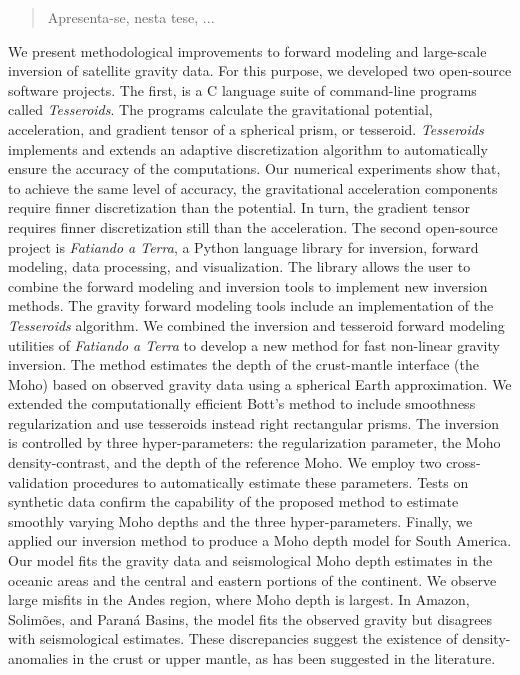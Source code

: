 \begin{abstract}

Apresenta-se, nesta tese, ...

\end{abstract}

\begin{foreignabstract}

We present methodological improvements to forward modeling and large-scale
inversion of satellite gravity data.
For this purpose, we developed two open-source software projects.
The first, is a C language suite of command-line programs called
\textit{Tesseroids}.
The programs calculate the gravitational potential, acceleration, and gradient
tensor of a spherical prism, or tesseroid.
\textit{Tesseroids} implements and extends an adaptive discretization algorithm
to automatically ensure the accuracy of the computations.
Our numerical experiments show that, to achieve the same level of accuracy, the
gravitational acceleration components require finner discretization than the
potential.
In turn, the gradient tensor requires finner discretization still than the
acceleration.
The second open-source project is \textit{Fatiando a Terra}, a Python language
library for inversion, forward modeling, data processing, and visualization.
The library allows the user to combine the forward modeling and inversion tools
to implement new inversion methods.
The gravity forward modeling tools include an implementation of the
\textit{Tesseroids} algorithm.
We combined the inversion and tesseroid forward modeling utilities of
\textit{Fatiando a Terra} to develop a new method for fast non-linear gravity
inversion.
The method estimates the depth of the crust-mantle interface (the Moho) based
on observed gravity data using a spherical Earth approximation.
We extended the computationally efficient Bott's method to include smoothness
regularization and use tesseroids instead right rectangular prisms.
The inversion is controlled by three hyper-parameters: the regularization
parameter, the Moho density-contrast, and the depth of the reference Moho.
We employ two cross-validation procedures to automatically estimate these
parameters.
Tests on synthetic data confirm the capability of the proposed method to
estimate smoothly varying Moho depths and the three hyper-parameters.
Finally, we applied our inversion method to produce a Moho depth model for
South America.
Our model fits the gravity data and seismological Moho depth estimates
in the oceanic areas and the central and eastern portions of the continent.
We observe large misfits in the Andes region, where Moho depth is largest.
In Amazon, Solimões, and Paraná Basins, the model fits the observed gravity
but disagrees with seismological estimates.
These discrepancies suggest the existence of density-anomalies in the crust or
upper mantle, as has been suggested in the literature.
\end{foreignabstract}
